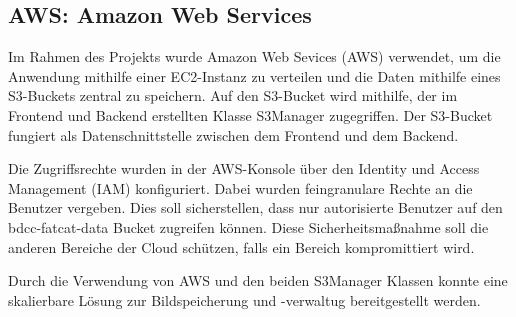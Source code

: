 \subsection{AWS: Amazon Web Services}
Im Rahmen des Projekts wurde Amazon Web Sevices (AWS) verwendet, um die Anwendung mithilfe einer EC2-Instanz zu verteilen und die Daten mithilfe eines S3-Buckets zentral zu speichern. Auf den
S3-Bucket wird mithilfe, der im Frontend und Backend erstellten Klasse \glqq S3Manager\grqq{} zugegriffen. Der S3-Bucket fungiert als Datenschnittstelle zwischen dem Frontend und dem Backend.

Die Zugriffsrechte wurden in der AWS-Konsole über den Identity und Access Management (IAM) konfiguriert. Dabei wurden feingranulare Rechte an die Benutzer 
vergeben. Dies soll sicherstellen, dass nur autorisierte Benutzer auf den \glqq bdcc-fatcat-data\grqq{} Bucket zugreifen können. Diese Sicherheitsmaßnahme soll die anderen Bereiche der Cloud schützen, falls ein Bereich kompromittiert wird.

Durch die Verwendung von AWS und den beiden S3Manager Klassen konnte eine skalierbare Lösung zur Bildspeicherung und -verwaltug bereitgestellt werden.